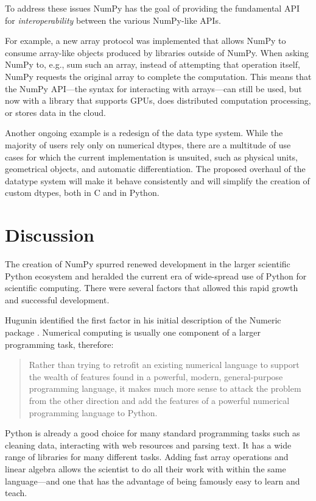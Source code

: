 To address these issues NumPy has the goal of providing the fundamental
API for \emph{interoperability} between the various NumPy-like APIs.

For example, a new array protocol was implemented that allows NumPy to consume
array-like objects produced by libraries outside of NumPy.  When asking NumPy
to, e.g., sum such an array, instead of attempting that operation itself, NumPy
requests the original array to complete the computation.  This means that the
NumPy API---the syntax for interacting with arrays---can still be used, but now
with a library that supports GPUs, does distributed computation processing, or
stores data in the cloud.

Another ongoing example is a redesign of the data type system.
While the majority of users rely only on numerical dtypes, there are a
multitude of use cases for which the current implementation is unsuited, such
as physical units\cite{astropy,Goldbaum2018,pint}, geometrical
objects\cite{pygeos}, and automatic differentiation\cite{pyadolc}.
The proposed overhaul of the datatype system will make it behave consistently
and will simplify the creation of custom dtypes, both in C and in Python.


\section*{Discussion}



The creation of NumPy spurred renewed development in the larger scientific
Python ecosystem and heralded the current era of wide-spread use of Python for
scientific computing.
There were several factors that allowed this rapid growth
and successful development.

Hugunin identified the first factor in his initial description of the Numeric
package \cite{Hugunin-whitepaper}.  Numerical computing is usually one
component of a larger programming task, therefore:
\begin{quote}
    Rather than trying to retrofit an existing numerical language to support
    the wealth of features found in a powerful, modern, general-purpose
    programming language, it makes much more sense to attack the problem from
    the other direction and add the features of a powerful numerical
    programming language to Python.
\end{quote}
Python is already a good choice for many standard programming tasks such as
cleaning data, interacting with web resources and parsing text.  It has a wide
range of libraries for many different tasks. Adding fast array operations and
linear algebra allows the scientist to do all their work with within the same
language---and one that has the advantage of being famously easy to learn and
teach.

